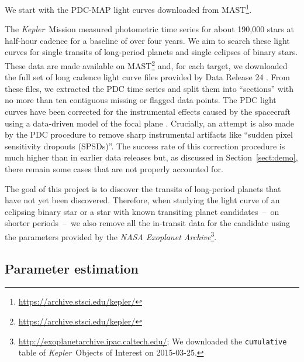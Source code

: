 \documentclass[manuscript, letterpaper]{aastex6}
\newcommand{\project}[1]{\textsl{#1}}
\newcommand{\kepler}{\project{Kepler}}
\newcommand{\sectionname}{Section}
\newcommand{\sectref}[1]{\ref{sect:#1}}
\newcommand{\Sect}[1]{\sectionname~\sectref{#1}}
\newcommand{\sect}[1]{\Sect{#1}}
\begin{document}
We start with the PDC-MAP light curves downloaded from
MAST\footnote{\url{https://archive.stsci.edu/kepler/}}.



The \kepler\ Mission measured photometric time series for about 190,000 stars
at half-hour cadence for a baseline of over four years.
We aim to search these light curves for single transits of long-period planets
and single eclipses of binary stars.
These data are made available on
MAST\footnote{\url{https://archive.stsci.edu/kepler/}} and, for each target,
we downloaded the full set of long cadence light curve files provided by Data
Release 24 \citep{Thompson:2015}.
From these files, we extracted the PDC time series and split them into
``sections'' with no more than ten contiguous missing or flagged data points.
The PDC light curves have been corrected for the instrumental effects caused
by the spacecraft using a data-driven model of the focal plane
\citep{Stumpe:2012, Smith:2012}.
Crucially, an attempt is also made by the PDC procedure to remove sharp
instrumental artifacts like ``sudden pixel sensitivity dropouts (SPSDs)''.
The success rate of this correction procedure is much higher than in earlier
data releases but, as discussed in \sect{demo}, there remain some cases that
are not properly accounted for.

The goal of this project is to discover the transits of long-period planets
that have not yet been discovered.
Therefore, when studying the light curve of an eclipsing binary star or a star
with known transiting planet candidates~--~on shorter periods~--~we also remove
all the in-transit data for the candidate using the parameters provided by the
\project{NASA Exoplanet
Archive}\footnote{\url{http://exoplanetarchive.ipac.caltech.edu/}; We
downloaded the \texttt{cumulative} table of \kepler\ Objects of Interest on
2015-03-25.}.


\subsection{Parameter estimation}
\end{document}
